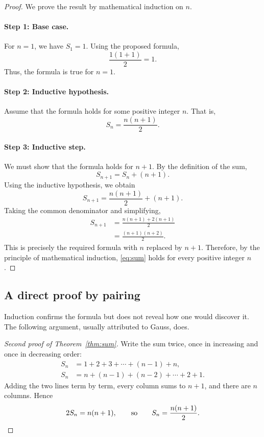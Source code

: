 \documentclass[12pt,a4paper]{article}
\theoremstyle{definition}
\begin{document}
\begin{proof}
We prove the result by mathematical induction on $n$.
 
\paragraph{Step 1: Base case.} For \(n=1\), we have \(S_1=1\). Using the proposed formula,
\[
\frac{1(1+1)}{2}=1.
\]
Thus, the formula is true for \(n=1\).
 
\paragraph{Step 2: Inductive hypothesis.} Assume that the formula holds for some positive integer \(n\). That is,
\[
S_n=\frac{n(n+1)}{2}.
\]
 
\paragraph{Step 3: Inductive step.} We must show that the formula holds for \(n+1\). By the definition of the sum,
\[
S_{n+1}=S_n+(n+1).
\]
Using the inductive hypothesis, we obtain
\[
S_{n+1}=\frac{n(n+1)}{2}+(n+1).
\]
Taking the common denominator and simplifying,
\[
\begin{aligned}
S_{n+1}
&=\frac{n(n+1)+2(n+1)}{2}\\
&=\frac{(n+1)(n+2)}{2}.
\end{aligned}
\]
This is precisely the required formula with \(n\) replaced by \(n+1\). Therefore, by the principle of mathematical induction, \eqref{eq:sum} holds for every positive integer \(n\).
\end{proof}
 
\subsection{A direct proof by pairing}
 
Induction confirms the formula but does not reveal how one would discover it. The following argument, usually attributed to Gauss, does.
 
\begin{proof}[Second proof of Theorem~\ref{thm:sum}]
Write the sum twice, once in increasing and once in decreasing order:
\[
\begin{aligned}
S_n &= 1 + 2 + 3 + \cdots + (n-1) + n,\\
S_n &= n + (n-1) + (n-2) + \cdots + 2 + 1.
\end{aligned}
\]
Adding the two lines term by term, every column sums to $n+1$, and there are $n$ columns. Hence
\[
2S_n = n(n+1), \qquad\text{so}\qquad S_n=\frac{n(n+1)}{2}. \qedhere
\]
\end{proof}
 
\end{document}
